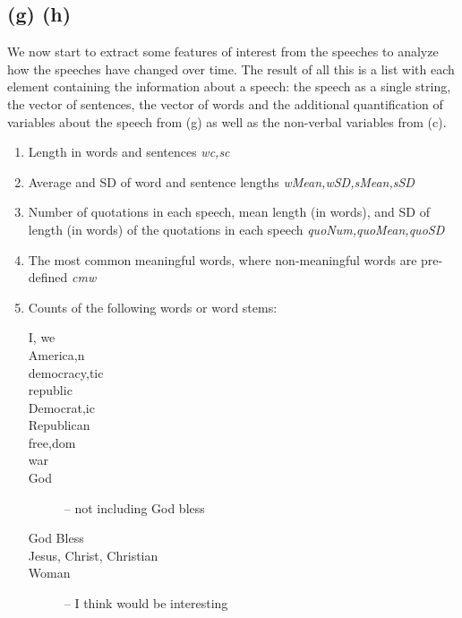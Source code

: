 \documentclass{article}\usepackage{graphicx, color}
\begin{document}
\subsection*{(g) (h)}

We now start to extract some features of interest from the speeches to analyze how the speeches have
changed over time. The result of all this is a list with each element containing the information
about a speech: the speech as a single string, the vector of sentences, the vector of words
and the additional quantification of variables about the speech from (g) as well as
the non-verbal variables from (c).

\begin{enumerate}
\item
Length in words and sentences \textit{wc,sc}
\item
Average and SD of word and sentence lengths \textit{wMean,wSD,sMean,sSD}
\item
Number of quotations in each speech, mean length (in words), and SD of length (in words) of the 
quotations in each speech \textit{quoNum,quoMean,quoSD}
\item
The most common meaningful words, where non-meaningful words are pre-defined \textit{cmw}
\item
Counts of the following words or word stems: 
\scriptsize
\begin{description}
\item[I, we]
\item[America{,n}]
\item[democra{cy,tic}]
\item[republic]
\item[Democrat{,ic}]
\item[Republican]
\item[free{,dom}]
\item[war]
\item[God] -- not including God bless
\item[God Bless]
\item[{Jesus, Christ, Christian}]
\item[Woman] -- I think would be interesting
\end{description}
\end{enumerate}
\normalsize
\end{document}

